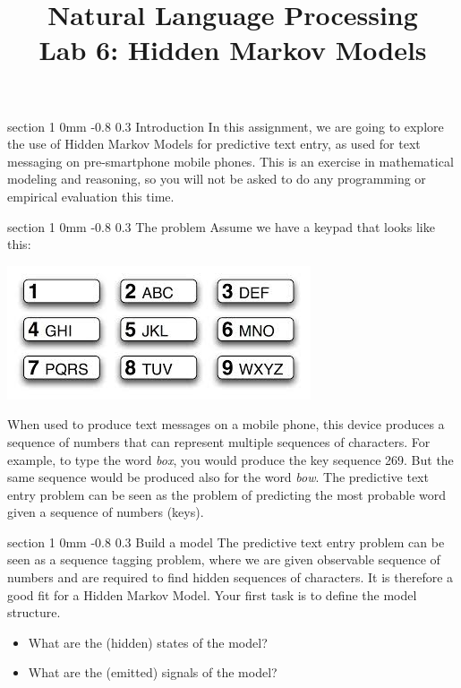 \documentclass[11pt]{article}
\title{{\LARGE Natural Language Processing}\\[1.5mm]{\large Lab 6: Hidden Markov Models}}
\author{}
\date{} %
\makeatletter
\newcommand{\newsec}[2]{\section{#1}\label{sec:#2}\noindent}
\renewcommand{\section}{\@startsection
{section}%
{1}%
{0mm}%
{-0.8\baselineskip}%
{0.3\baselineskip}%
{\bfseries\large}}%
\makeatother
\begin{document}
 

\maketitle
\vspace{-2mm} \newsec{Introduction}{intro}%
In this assignment, we are going to explore the use of Hidden Markov
Models for predictive text entry, as used for text messaging on
pre-smartphone mobile phones.  This is an exercise in mathematical
modeling and reasoning, so you will not be asked to do any programming
or empirical evaluation this time.

\newsec{The problem}{problem}%
Assume we have a keypad that looks like this:
\begin{center}
\includegraphics[scale=0.5]{keypad.jpeg}
\end{center}
When used to produce text messages on a mobile phone, this device
produces a sequence of numbers that can represent multiple sequences
of characters.  For example, to type the word {\em box}, you would
produce the key sequence 269. But the same sequence would be produced
also for the word {\em bow}.  The predictive text entry problem can be
seen as the problem of predicting the most probable word given a
sequence of numbers (keys).

\newsec{Build a model}{model}%
The predictive text entry problem can be seen as a sequence tagging
problem, where we are given observable sequence of numbers and are
required to find hidden sequences of characters. It is therefore a
good fit for a Hidden Markov Model. Your first task is to define the
model structure.
\begin{itemize}[noitemsep,topsep=0.2cm]
\item What are the (hidden) states of the model?
\item What are the (emitted) signals of the model?
\end{itemize}
\end{document}

